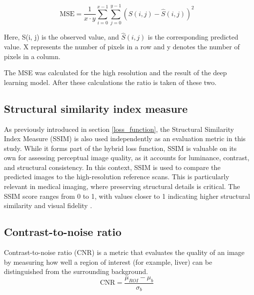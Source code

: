 \documentclass[twocolumn]{article}
\begin{document}
\begin{equation}\label{eq:MSE}
    \text{MSE} = \frac{1}{x \cdot y} \sum_{i=0}^{x-1} \sum_{j=0}^{y-1} \left( S(i, j) - \hat{S}(i, j) \right)^2
\end{equation}

Here, S(i, j) is the observed value, and $\hat{S}(i, j)$  is the corresponding predicted value. 
X represents the number of pixels in a row and y denotes the number of pixels in a column. \cite{mseJim}

The MSE was calculated for the high resolution and the result of the deep learning model. After these calculations the ratio is taken of these two.

\subsection{Structural similarity index measure}\label{Structural similarity index measure}

As previously introduced in section \ref{loss_function}, the Structural Similarity Index Measure (SSIM) is also used independently as an evaluation metric in this study.  
While it forms part of the hybrid loss function, SSIM is valuable on its own for assessing perceptual image quality, as it accounts for luminance, contrast, and structural consistency.
In this context, SSIM is used to compare the predicted images to the high-resolution reference scans.  
This is particularly relevant in medical imaging, where preserving structural details is critical.  
The SSIM score ranges from 0 to 1, with values closer to 1 indicating higher structural similarity and visual fidelity \cite{dosselmann-2009}.

\subsection{Contrast-to-noise ratio}
Contrast-to-noise ratio (CNR) is a metric that evaluates the quality of an image by measuring how well a region of interest (for example, liver) can be distinguished from the surrounding background.
\begin{equation}\label{eq:CNR}
\text{CNR}=\frac{\mu_{ROI}-\mu_b}{\sigma_b}
\end{equation}
\end{document}
